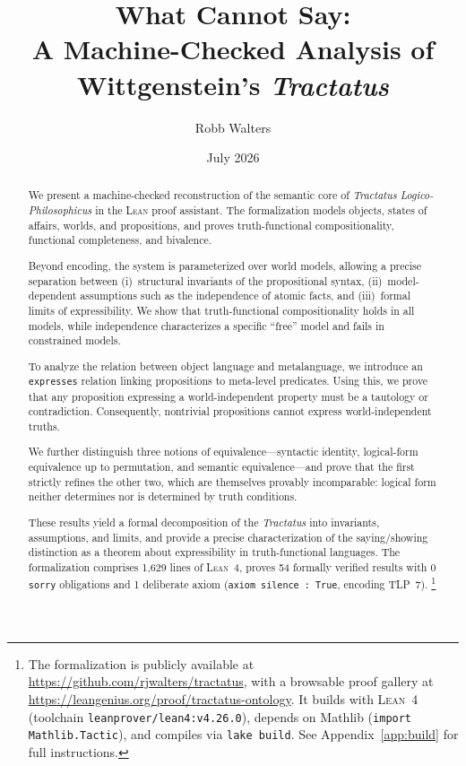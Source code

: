 \documentclass[10pt, letterpaper]{article}
\title{What \Lean{} Cannot Say:\\
A Machine-Checked Analysis of Wittgenstein's \emph{Tractatus}}
\author{Robb Walters}
\date{July 2026}
\theoremstyle{definition}
\theoremstyle{remark}
\newcommand{\Lean}{\textsc{Lean}}
\begin{document}
\maketitle

\begin{abstract}
We present a machine-checked reconstruction of the semantic core
of \emph{Tractatus Logico-Philosophicus} in the \Lean{} proof
assistant.  The formalization models objects, states of affairs,
worlds, and propositions, and proves truth-functional
compositionality, functional completeness, and bivalence.

Beyond encoding, the system is parameterized over world models,
allowing a precise separation between (i)~structural invariants
of the propositional syntax, (ii)~model-dependent assumptions
such as the independence of atomic facts, and (iii)~formal limits
of expressibility.  We show that truth-functional compositionality
holds in all models, while independence characterizes a specific
``free'' model and fails in constrained models.

To analyze the relation between object language and metalanguage,
we introduce an \texttt{expresses} relation linking propositions
to meta-level predicates.  Using this, we prove that any
proposition expressing a world-independent property must be a
tautology or contradiction.  Consequently, nontrivial propositions
cannot express world-independent truths.

We further distinguish three notions of
equivalence---syntactic identity, logical-form equivalence up to
permutation, and semantic equivalence---and prove that the first
strictly refines the other two, which are themselves provably
incomparable: logical form neither determines nor is determined
by truth conditions.

These results yield a formal decomposition of the \emph{Tractatus}
into invariants, assumptions, and limits, and provide a precise
characterization of the saying/showing distinction as a theorem
about expressibility in truth-functional languages.
The formalization comprises 1,629 lines of \Lean~4, proves 54
formally verified results with 0 \texttt{sorry} obligations
and 1 deliberate axiom (\texttt{axiom silence : True}, encoding
TLP~7).%
\footnote{The formalization is publicly available at
  \url{https://github.com/rjwalters/tractatus},
  with a browsable proof gallery at
  \url{https://leangenius.org/proof/tractatus-ontology}.
  It builds with \Lean~4 (toolchain \texttt{leanprover/lean4:v4.26.0}),
  depends on Mathlib (\texttt{import Mathlib.Tactic}), and compiles via
  \texttt{lake build}.  See Appendix~\ref{app:build} for full
  instructions.}
\end{abstract}
\end{document}
